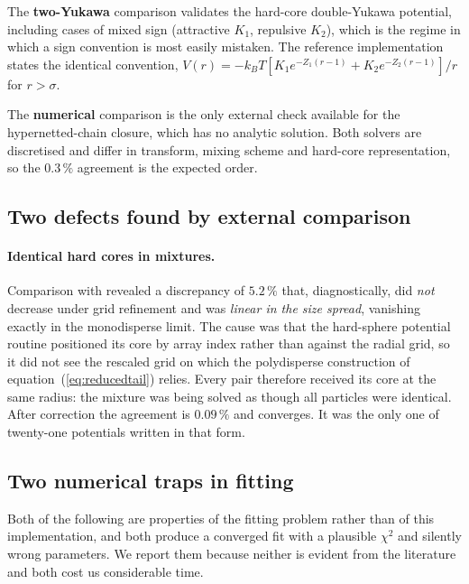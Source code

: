 The \textbf{two-Yukawa} comparison validates the hard-core double-Yukawa
potential, including cases of mixed sign (attractive $K_1$, repulsive $K_2$),
which is the regime in which a sign convention is most easily mistaken. The
reference implementation states the identical convention,
$V(r) = -k_BT[K_1 e^{-Z_1(r-1)} + K_2 e^{-Z_2(r-1)}]/r$ for $r>\sigma$.

The \textbf{numerical} comparison is the only external check available for the
hypernetted-chain closure, which has no analytic solution. Both solvers are
discretised and differ in transform, mixing scheme and hard-core
representation, so the $0.3\,\%$ agreement is the expected order.

\subsection{Two defects found by external comparison}

\paragraph{Identical hard cores in mixtures.}
Comparison with  revealed a discrepancy of $5.2\,\%$ that,
diagnostically, did \emph{not} decrease under grid refinement and was
\emph{linear in the size spread}, vanishing exactly in the monodisperse limit.
The cause was that the hard-sphere potential routine positioned its core by
array index rather than against the radial grid, so it did not see the
rescaled grid on which the polydisperse construction of
equation~(\ref{eq:reducedtail}) relies. Every pair therefore received its core
at the same radius: the mixture was being solved as though all particles were
identical. After correction the agreement is $0.09\,\%$ and converges. It was
the only one of twenty-one potentials written in that form.

\subsection{Two numerical traps in fitting}

Both of the following are properties of the fitting problem rather than of
this implementation, and both produce a converged fit with a plausible
$\chi^2$ and silently wrong parameters. We report them because neither is
evident from the literature and both cost us considerable time.

